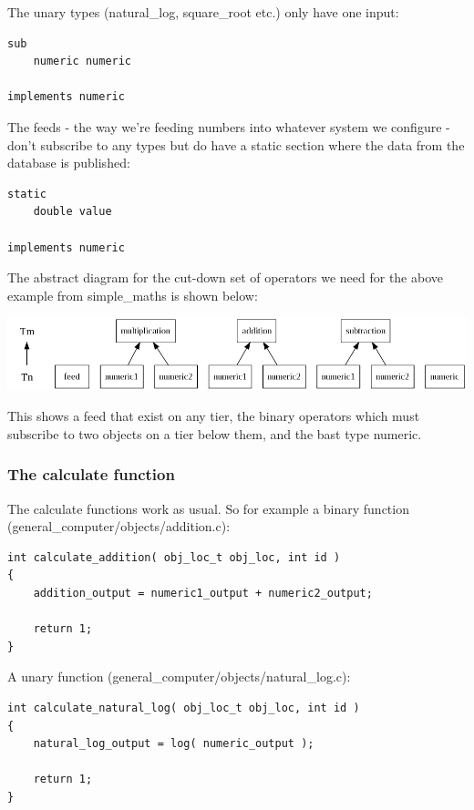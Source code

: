 \documentclass{report}
\begin{document}
The unary types (natural_log, square_root etc.) only have one input:

\begin{verbatim}
sub
    numeric numeric

implements numeric
\end{verbatim}

The feeds - the way we're feeding numbers into whatever system we configure - don't subscribe to any types but do have a static section where the data from the database is published:


\begin{verbatim}
static
    double value

implements numeric
\end{verbatim}

The abstract diagram for the cut-down set of operators we need for the above example from simple_maths is shown below:

\includegraphics[scale=0.4]{generalcomputerabstractsimple.png}

This shows a feed that exist on any tier, the binary operators which must subscribe to two objects on a tier below them, and the bast type numeric.

\subsubsection{The calculate function}

The calculate functions work as usual. So for example a binary function (general_computer/objects/addition.c):

\begin{verbatim}
int calculate_addition( obj_loc_t obj_loc, int id )
{
    addition_output = numeric1_output + numeric2_output;

    return 1;
}
\end{verbatim}

A unary function (general_computer/objects/natural_log.c):

\begin{verbatim}
int calculate_natural_log( obj_loc_t obj_loc, int id )
{
    natural_log_output = log( numeric_output );

    return 1;
}
\end{verbatim}
\end{document}
